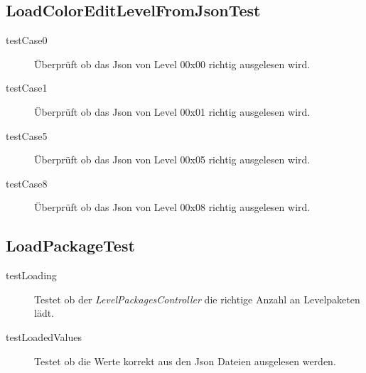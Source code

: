 \subsection{LoadColorEditLevelFromJsonTest}
	\begin{description}
		\item[testCase0] Überprüft ob das Json von Level 00x00 richtig ausgelesen wird.
		\item[testCase1] Überprüft ob das Json von Level 00x01 richtig ausgelesen wird.
		\item[testCase5] Überprüft ob das Json von Level 00x05 richtig ausgelesen wird.
		\item[testCase8] Überprüft ob das Json von Level 00x08 richtig ausgelesen wird.
	\end{description}

\subsection{LoadPackageTest}
	\begin{description}
		\item[testLoading] Testet ob der \emph{LevelPackagesController} die richtige Anzahl an Levelpaketen lädt.
		\item[testLoadedValues] Testet ob die Werte korrekt aus den Json Dateien ausgelesen werden.
	\end{description}
